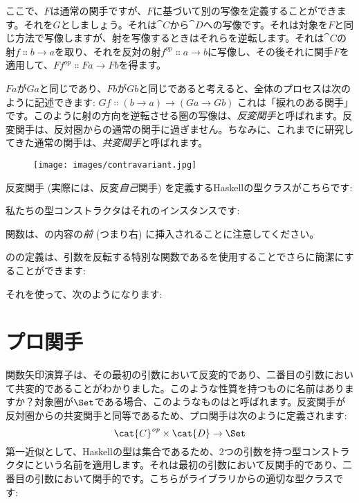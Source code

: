 ここで、$F$は通常の関手ですが、$F$に基づいて別の写像を定義することができます。それを$G$としましょう。それは$\cat{C}$から$\cat{D}$への写像です。それは対象を$F$と同じ方法で写像しますが、射を写像するときはそれらを逆転します。それは$\cat{C}$の射$f \Colon b \to a$を取り、それを反対の射$f^\mathit{op} \Colon a \to b$に写像し、その後それに関手$F$を適用して、$F f^\mathit{op} \Colon F a \to F b$を得ます。

$F a$が$G a$と同じであり、$F b$が$G b$と同じであると考えると、全体のプロセスは次のように記述できます: $G f \Colon (b \to a) \to (G a \to G b)$
これは「捩れのある関手」です。このように射の方向を逆転させる圏の写像は、\emph{反変関手}と呼ばれます。反変関手は、反対圏からの通常の関手に過ぎません。ちなみに、これまでに研究してきた通常の関手は、\emph{共変関手}と呼ばれます。

\begin{figure}[H]
  \centering
  \texttt{[image: images/contravariant.jpg]}
\end{figure}

\noindent
反変関手 (実際には、反変\emph{自己}関手) を定義するHaskellの型クラスがこちらです: 

私たちの型コンストラクタはそれのインスタンスです: 

関数は、の内容の\emph{前} (つまり右) に挿入されることに注意してください。

のの定義は、引数を反転する特別な関数であるを使用することでさらに簡潔にすることができます: 

それを使って、次のようになります: 


\section{プロ関手}

関数矢印演算子は、その最初の引数において反変的であり、二番目の引数において共変的であることがわかりました。このような性質を持つものに名前はありますか？対象圏が$\Set$である場合、このようなものはと呼ばれます。反変関手が反対圏からの共変関手と同等であるため、プロ関手は次のように定義されます: 
\[\cat{C}^\mathit{op} \times \cat{D} \to \Set\]
第一近似として、Haskellの型は集合であるため、2つの引数を持つ型コンストラクタにという名前を適用します。それは最初の引数において反関手的であり、二番目の引数において関手的です。こちらがライブラリからの適切な型クラスです: 

